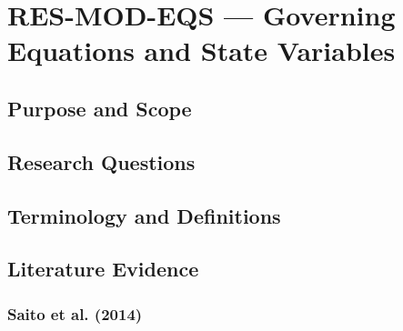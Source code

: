 
\section{RES-MOD-EQS --- Governing Equations and State Variables}
\label{sec:res-mod-eqs}

\subsection{Purpose and Scope}
\label{sec:res-mod-eqs-purpose}


\subsection{Research Questions}
\label{sec:res-mod-eqs-research-questions}


\subsection{Terminology and Definitions}
\label{sec:res-mod-eqs-definitions}


\subsection{Literature Evidence}
\label{sec:res-mod-eqs-literature-evidence}

%

\subsubsection{Saito et al. (2014)}
\label{sec:res-mod-eqs-evidence-saito-2014}

